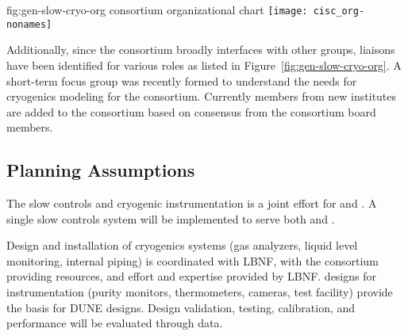 \begin{dunefigure}{fig:gen-slow-cryo-org}
{ consortium organizational chart}
\texttt{[image: cisc\_org-nonames]}  %
\end{dunefigure}

Additionally, since the  consortium broadly interfaces with other
groups, liaisons have been identified for various roles as listed in
Figure~\ref{fig:gen-slow-cryo-org}. A short-term focus group was
recently formed to understand the needs for cryogenics modeling for the
consortium.  Currently members from new
institutes are added to the consortium based on consensus from the
consortium board members.




\subsection{Planning Assumptions}
\label{sec:fdgen-slow-cryo-org-assmp}

The slow controls and cryogenic instrumentation is a joint effort for \single and \dual{}.
A single slow controls system will be implemented to serve both \single and \dual{}.

Design and installation of cryogenics systems (gas analyzers, liquid level monitoring, internal piping) is coordinated with LBNF, with the consortium providing resources, and effort and expertise provided by LBNF.
 designs for \lar instrumentation (purity monitors, thermometers, cameras, test facility) provide the basis for DUNE designs. Design validation, testing, calibration, and performance will be evaluated through  data.



